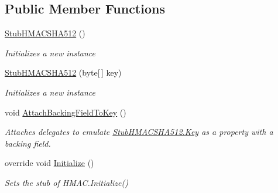 \subsection*{Public Member Functions}
\begin{DoxyCompactItemize}
\item 
\hyperlink{class_system_1_1_security_1_1_cryptography_1_1_fakes_1_1_stub_h_m_a_c_s_h_a512_a7e606926066c9498c2c0ddfb7c0c0390}{Stub\-H\-M\-A\-C\-S\-H\-A512} ()
\begin{DoxyCompactList}\small\item\em Initializes a new instance\end{DoxyCompactList}\item 
\hyperlink{class_system_1_1_security_1_1_cryptography_1_1_fakes_1_1_stub_h_m_a_c_s_h_a512_a8633ce2ac7ca196b7eb8899aa3f1f611}{Stub\-H\-M\-A\-C\-S\-H\-A512} (byte\mbox{[}$\,$\mbox{]} key)
\begin{DoxyCompactList}\small\item\em Initializes a new instance\end{DoxyCompactList}\item 
void \hyperlink{class_system_1_1_security_1_1_cryptography_1_1_fakes_1_1_stub_h_m_a_c_s_h_a512_a199b39632151a17a3614fad01a0a3f17}{Attach\-Backing\-Field\-To\-Key} ()
\begin{DoxyCompactList}\small\item\em Attaches delegates to emulate \hyperlink{class_system_1_1_security_1_1_cryptography_1_1_fakes_1_1_stub_h_m_a_c_s_h_a512_acb295799eb08d83aa05bc57f50390690}{Stub\-H\-M\-A\-C\-S\-H\-A512.\-Key} as a property with a backing field.\end{DoxyCompactList}\item 
override void \hyperlink{class_system_1_1_security_1_1_cryptography_1_1_fakes_1_1_stub_h_m_a_c_s_h_a512_adb28a386408523021040e05c4df271c9}{Initialize} ()
\begin{DoxyCompactList}\small\item\em Sets the stub of H\-M\-A\-C.\-Initialize()\end{DoxyCompactList}\end{DoxyCompactItemize}
